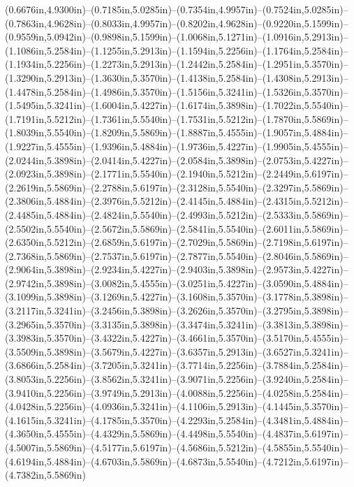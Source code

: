 (0.6676in,4.9300in)--(0.7185in,5.0285in)--(0.7354in,4.9957in)--(0.7524in,5.0285in)--(0.7863in,4.9628in)--(0.8033in,4.9957in)--(0.8202in,4.9628in)--(0.9220in,5.1599in)--(0.9559in,5.0942in)--(0.9898in,5.1599in)--(1.0068in,5.1271in)--(1.0916in,5.2913in)--(1.1086in,5.2584in)--(1.1255in,5.2913in)--(1.1594in,5.2256in)--(1.1764in,5.2584in)--(1.1934in,5.2256in)--(1.2273in,5.2913in)--(1.2442in,5.2584in)--(1.2951in,5.3570in)--(1.3290in,5.2913in)--(1.3630in,5.3570in)--(1.4138in,5.2584in)--(1.4308in,5.2913in)--(1.4478in,5.2584in)--(1.4986in,5.3570in)--(1.5156in,5.3241in)--(1.5326in,5.3570in)--(1.5495in,5.3241in)--(1.6004in,5.4227in)--(1.6174in,5.3898in)--(1.7022in,5.5540in)--(1.7191in,5.5212in)--(1.7361in,5.5540in)--(1.7531in,5.5212in)--(1.7870in,5.5869in)--(1.8039in,5.5540in)--(1.8209in,5.5869in)--(1.8887in,5.4555in)--(1.9057in,5.4884in)--(1.9227in,5.4555in)--(1.9396in,5.4884in)--(1.9736in,5.4227in)--(1.9905in,5.4555in)--(2.0244in,5.3898in)--(2.0414in,5.4227in)--(2.0584in,5.3898in)--(2.0753in,5.4227in)--(2.0923in,5.3898in)--(2.1771in,5.5540in)--(2.1940in,5.5212in)--(2.2449in,5.6197in)--(2.2619in,5.5869in)--(2.2788in,5.6197in)--(2.3128in,5.5540in)--(2.3297in,5.5869in)--(2.3806in,5.4884in)--(2.3976in,5.5212in)--(2.4145in,5.4884in)--(2.4315in,5.5212in)--(2.4485in,5.4884in)--(2.4824in,5.5540in)--(2.4993in,5.5212in)--(2.5333in,5.5869in)--(2.5502in,5.5540in)--(2.5672in,5.5869in)--(2.5841in,5.5540in)--(2.6011in,5.5869in)--(2.6350in,5.5212in)--(2.6859in,5.6197in)--(2.7029in,5.5869in)--(2.7198in,5.6197in)--(2.7368in,5.5869in)--(2.7537in,5.6197in)--(2.7877in,5.5540in)--(2.8046in,5.5869in)--(2.9064in,5.3898in)--(2.9234in,5.4227in)--(2.9403in,5.3898in)--(2.9573in,5.4227in)--(2.9742in,5.3898in)--(3.0082in,5.4555in)--(3.0251in,5.4227in)--(3.0590in,5.4884in)--(3.1099in,5.3898in)--(3.1269in,5.4227in)--(3.1608in,5.3570in)--(3.1778in,5.3898in)--(3.2117in,5.3241in)--(3.2456in,5.3898in)--(3.2626in,5.3570in)--(3.2795in,5.3898in)--(3.2965in,5.3570in)--(3.3135in,5.3898in)--(3.3474in,5.3241in)--(3.3813in,5.3898in)--(3.3983in,5.3570in)--(3.4322in,5.4227in)--(3.4661in,5.3570in)--(3.5170in,5.4555in)--(3.5509in,5.3898in)--(3.5679in,5.4227in)--(3.6357in,5.2913in)--(3.6527in,5.3241in)--(3.6866in,5.2584in)--(3.7205in,5.3241in)--(3.7714in,5.2256in)--(3.7884in,5.2584in)--(3.8053in,5.2256in)--(3.8562in,5.3241in)--(3.9071in,5.2256in)--(3.9240in,5.2584in)--(3.9410in,5.2256in)--(3.9749in,5.2913in)--(4.0088in,5.2256in)--(4.0258in,5.2584in)--(4.0428in,5.2256in)--(4.0936in,5.3241in)--(4.1106in,5.2913in)--(4.1445in,5.3570in)--(4.1615in,5.3241in)--(4.1785in,5.3570in)--(4.2293in,5.2584in)--(4.3481in,5.4884in)--(4.3650in,5.4555in)--(4.4329in,5.5869in)--(4.4498in,5.5540in)--(4.4837in,5.6197in)--(4.5007in,5.5869in)--(4.5177in,5.6197in)--(4.5686in,5.5212in)--(4.5855in,5.5540in)--(4.6194in,5.4884in)--(4.6703in,5.5869in)--(4.6873in,5.5540in)--(4.7212in,5.6197in)--(4.7382in,5.5869in) 